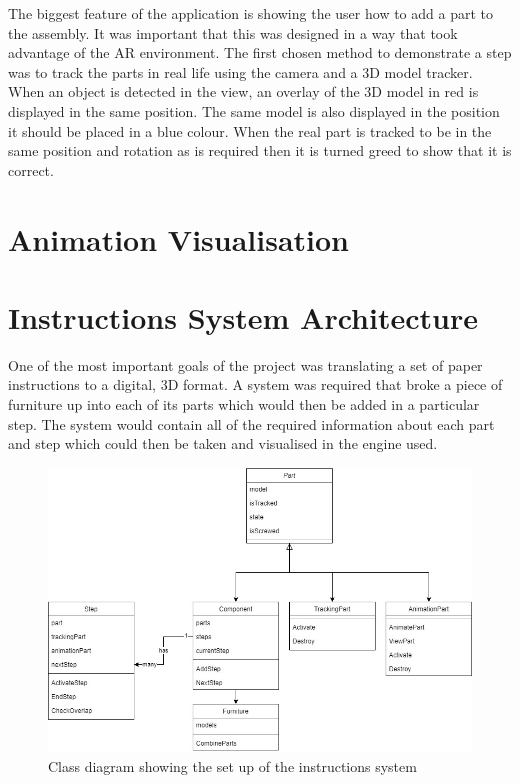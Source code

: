 \documentclass{l4proj}
\begin{document}
The biggest feature of the application is showing the user how to add a part to the assembly. It was important that this was designed in a way that took advantage of the AR environment. The first chosen method to demonstrate a step was to track the parts in real life using the camera and a 3D model tracker. When an object is detected in the view, an overlay of the 3D model in red is displayed in the same position. The same model is also displayed in the position it should be placed in a blue colour. When the real part is tracked to be in the same position and rotation as is required then it is turned greed to show that it is correct.

\section{Animation Visualisation}

\section{Instructions System Architecture}

One of the most important goals of the project was translating a set of paper instructions to a digital, 3D format. A system was required that broke a piece of furniture up into each of its parts which would then be added in a particular step. The system would contain all of the required information about each part and step which could then be taken and visualised in the engine used.

\begin{figure}[hbt!]
    \centering
    \includegraphics[width=0.8\linewidth]{dissertation//images/classDiagram.jpg}
    \caption{Class diagram showing the set up of the instructions system}
    \label{fig:classDiagram}
\end{figure}
\end{document}
